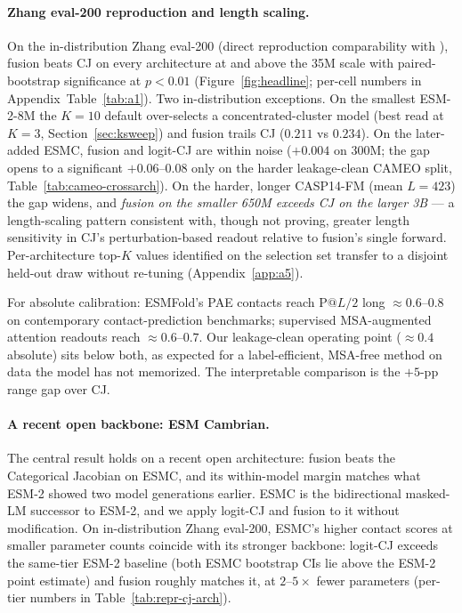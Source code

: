 \documentclass{article}
\begin{document}
\paragraph{Zhang eval-200 reproduction and length scaling.}
On the in-distribution Zhang eval-200 (direct reproduction comparability
with \citet{zhang2024cj}), fusion beats CJ on every architecture at and
above the 35M scale with paired-bootstrap significance at $p<0.01$
(Figure~\ref{fig:headline}; per-cell numbers in
Appendix~Table~\ref{tab:a1}). Two in-distribution exceptions. On the
smallest ESM-2-8M the $K{=}10$ default over-selects a
concentrated-cluster model (best read at $K{=}3$,
Section~\ref{sec:ksweep}) and fusion trails CJ ($0.211$ vs $0.234$). On
the later-added ESMC, fusion and logit-CJ are within noise
($+0.004$ on $300$M; the gap opens to a significant $+0.06$--$0.08$
only on the harder leakage-clean CAMEO split, Table~\ref{tab:cameo-crossarch}). On the harder, longer CASP14-FM
(mean $L{=}423$) the gap widens, and \emph{fusion on the smaller
650M exceeds CJ on the larger 3B} --- a length-scaling pattern
consistent with, though not proving, greater length sensitivity in
CJ's perturbation-based readout relative to fusion's single forward.
Per-architecture top-$K$ values identified on the selection
set transfer to a disjoint held-out draw without re-tuning
(Appendix~\ref{app:a5}).

For absolute calibration: ESMFold's PAE contacts \citep{lin2023esm2}
reach $\text{P}@L/2$ long $\approx 0.6$--$0.8$ on contemporary
contact-prediction benchmarks; supervised MSA-augmented attention
readouts \citep{rao2021msa} reach $\approx 0.6$--$0.7$. Our
leakage-clean operating point ($\approx 0.4$ absolute) sits below both,
as expected for a label-efficient, MSA-free method on data the
model has not memorized. The interpretable comparison is the
$+5$-pp range gap over CJ.

\paragraph{A recent open backbone: ESM Cambrian.}
The central result holds on a recent open architecture: fusion beats
the Categorical Jacobian on ESMC, and its within-model margin matches
what ESM-2 showed two model generations earlier. ESMC
\citep{esmteam2024esmc,biohub2026esm} is the bidirectional masked-LM
successor to ESM-2, and we apply logit-CJ and fusion to it without
modification. On in-distribution Zhang eval-200, ESMC's higher contact
scores at smaller parameter counts coincide with its stronger backbone:
logit-CJ exceeds the same-tier ESM-2 baseline (both ESMC bootstrap CIs
lie above the ESM-2 point estimate) and fusion roughly matches it, at
$2$--$5\times$ fewer parameters (per-tier numbers in
Table~\ref{tab:repr-cj-arch}).
\end{document}
